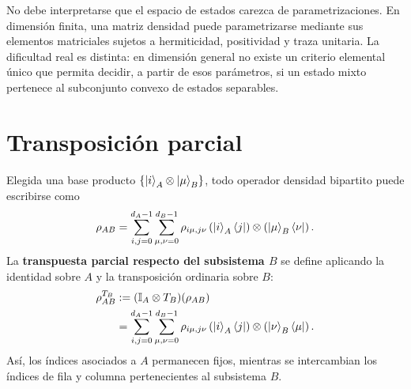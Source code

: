 \documentclass[../main.tex]{subfiles}
\begin{document}
No debe interpretarse que el espacio de estados carezca de parametrizaciones. En dimensión finita, una matriz densidad puede parametrizarse mediante sus elementos matriciales sujetos a hermiticidad, positividad y traza unitaria. La dificultad real es distinta: en dimensión general no existe un criterio elemental único que permita decidir, a partir de esos parámetros, si un estado mixto pertenece al subconjunto convexo de estados separables.

\section{Transposición parcial}

Elegida una base producto $\{\ket{i}_A\otimes\ket{\mu}_B\}$, todo operador densidad bipartito puede escribirse como
\begin{equation*}
    \rho_{AB}
    =\sum_{i,j=0}^{d_A-1}
     \sum_{\mu,\nu=0}^{d_B-1}
     \rho_{i\mu,j\nu}
     \left(\ket{i}_A\bra{j}\right)
     \otimes
     \left(\ket{\mu}_B\bra{\nu}\right).
\end{equation*}
La \textbf{transpuesta parcial respecto del subsistema $B$} se define aplicando la identidad sobre $A$ y la transposición ordinaria sobre $B$:
\begin{align*}
    \rho_{AB}^{T_B}
    &:=(\mathbb{I}_A\otimes T_B)(\rho_{AB})\\
    &=\sum_{i,j=0}^{d_A-1}
     \sum_{\mu,\nu=0}^{d_B-1}
     \rho_{i\mu,j\nu}
     \left(\ket{i}_A\bra{j}\right)
     \otimes
     \left(\ket{\nu}_B\bra{\mu}\right).
\end{align*}
Así, los índices asociados a $A$ permanecen fijos, mientras se intercambian los índices de fila y columna pertenecientes al subsistema $B$.
\end{document}
